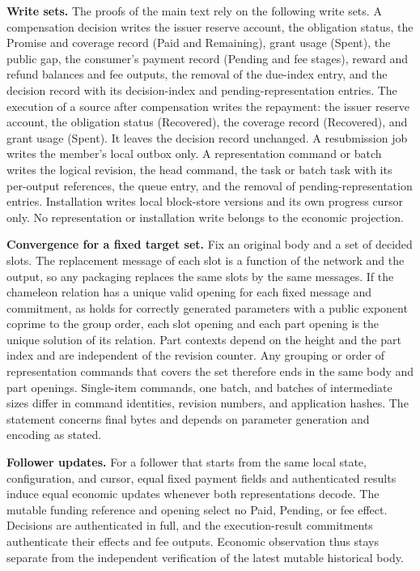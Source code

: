 \noindent\textbf{Write sets.}
The proofs of the main text rely on the following write sets. A compensation decision writes the issuer reserve account, the obligation status, the Promise and coverage record (Paid and Remaining), grant usage (Spent), the public gap, the consumer's payment record (Pending and fee stages), reward and refund balances and fee outputs, the removal of the due-index entry, and the decision record with its decision-index and pending-representation entries. The execution of a source after compensation writes the repayment: the issuer reserve account, the obligation status (Recovered), the coverage record (Recovered), and grant usage (Spent). It leaves the decision record unchanged. A resubmission job writes the member's local outbox only. A representation command or batch writes the logical revision, the head command, the task or batch task with its per-output references, the queue entry, and the removal of pending-representation entries. Installation writes local block-store versions and its own progress cursor only. No representation or installation write belongs to the economic projection.

\noindent\textbf{Convergence for a fixed target set.}
Fix an original body and a set of decided slots. The replacement message of each slot is a function of the network and the output, so any packaging replaces the same slots by the same messages. If the chameleon relation has a unique valid opening for each fixed message and commitment, as holds for correctly generated parameters with a public exponent coprime to the group order, each slot opening and each part opening is the unique solution of its relation. Part contexts depend on the height and the part index and are independent of the revision counter. Any grouping or order of representation commands that covers the set therefore ends in the same body and part openings. Single-item commands, one batch, and batches of intermediate sizes differ in command identities, revision numbers, and application hashes. The statement concerns final bytes and depends on parameter generation and encoding as stated.

\noindent\textbf{Follower updates.}
For a follower that starts from the same local state, configuration, and cursor, equal fixed payment fields and authenticated results induce equal economic updates whenever both representations decode. The mutable funding reference and opening select no Paid, Pending, or fee effect. Decisions are authenticated in full, and the execution-result commitments authenticate their effects and fee outputs. Economic observation thus stays separate from the independent verification of the latest mutable historical body.

